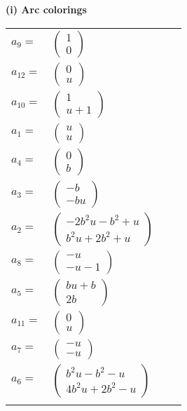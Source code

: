 \documentclass[1p]{elsarticle_modified}
\theoremstyle{definition}
\begin{document}
\flushleft \textbf{(i) Arc colorings}\\
\begin{tabular}{m{7pt} m{180pt} m{7pt} m{180pt} }
\flushright $a_{9}=$&$\begin{pmatrix}1\\0\end{pmatrix}$ \\
\flushright $a_{12}=$&$\begin{pmatrix}0\\u\end{pmatrix}$ \\
\flushright $a_{10}=$&$\begin{pmatrix}1\\u+1\end{pmatrix}$ \\
\flushright $a_{1}=$&$\begin{pmatrix}u\\u\end{pmatrix}$ \\
\flushright $a_{4}=$&$\begin{pmatrix}0\\b\end{pmatrix}$ \\
\flushright $a_{3}=$&$\begin{pmatrix}- b\\- b u\end{pmatrix}$ \\
\flushright $a_{2}=$&$\begin{pmatrix}-2 b^2 u- b^2+u\\b^2 u+2 b^2+u\end{pmatrix}$ \\
\flushright $a_{8}=$&$\begin{pmatrix}- u\\- u-1\end{pmatrix}$ \\
\flushright $a_{5}=$&$\begin{pmatrix}b u+b\\2 b\end{pmatrix}$ \\
\flushright $a_{11}=$&$\begin{pmatrix}0\\u\end{pmatrix}$ \\
\flushright $a_{7}=$&$\begin{pmatrix}- u\\- u\end{pmatrix}$ \\
\flushright $a_{6}=$&$\begin{pmatrix}b^2 u- b^2- u\\4 b^2 u+2 b^2- u\end{pmatrix}$\\&\end{tabular}
\end{document}
